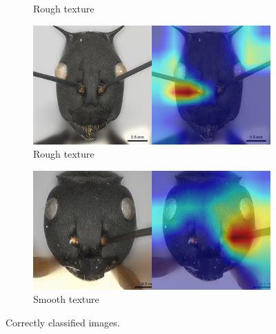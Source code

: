 \documentclass{aci}
\numberwithin{equation}{section}
\begin{document}
\begin{figure}
\begin{subfigure}{\subwidth}
        \caption*{Rough texture}
        \label{fig:correct_nonideal_1554}
    \end{subfigure}
    \begin{subfigure}{\subwidth}
        \includegraphics[width=1\linewidth]{thesis_assets/gradcam/correct_nonideal/1694.png}
        \caption*{Rough texture}
        \label{fig:correct_nonideal_1694}
    \end{subfigure}
    \begin{subfigure}{\subwidth}
        \includegraphics[width=1\linewidth]{thesis_assets/gradcam/correct_nonideal/388.png}
        \caption*{Smooth texture}
        \label{fig:correct_nonideal_388}
    \end{subfigure}
    \caption{Correctly classified images.}
    \label{fig:correct_images}
\end{figure}
\end{document}

